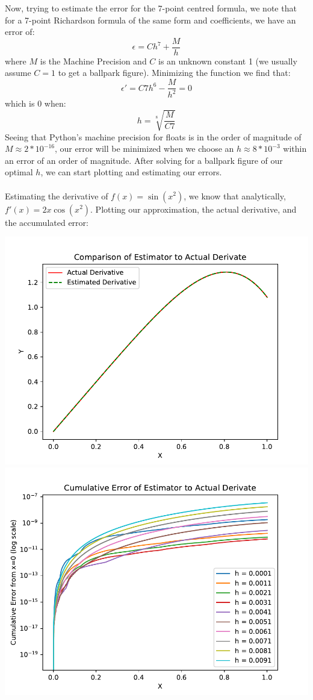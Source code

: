\documentclass[10pt]{article} %
\begin{document}
\noindent Now, trying to estimate the error for the 7-point centred formula, we note that for a 7-point Richardson formula of the same form and coefficients, we have an error of:
\begin{equation}
	\epsilon = Ch^7 + \frac{M}{h}
\end{equation}
where $M$ is the Machine Precision and $C$ is an unknown constant 1 (we usually assume $C=1$ to get a ballpark figure). Minimizing the function we find that:
\begin{equation}
	\epsilon' = C7h^6 - \frac{M}{h^2} = 0
\end{equation}
which is $0$ when:
\begin{equation}
	h = \sqrt[8]{\frac{M}{C7}}
\end{equation}
Seeing that Python's machine precision for floats is in the order of magnitude of $M \approx 2 * 10^{-16}$, our error will be minimized when we choose an $h \approx 8 * 10^{-3}$ within an error of an order of magnitude. After solving for a ballpark figure of our optimal $h$, we can start plotting and estimating our errors.
\\ \\
Estimating the derivative of $f(x) = \sin(x^2)$, we know that analytically, $f'(x) = 2x\cos(x^2)$. Plotting our approximation, the actual derivative, and the accumulated error:
\begin{center}
\includegraphics[width=.45\textwidth]{../figs/q1_comparison.pdf}
\includegraphics[width=.45\textwidth]{../figs/q1_error.pdf}
\end{center}
\end{document}
